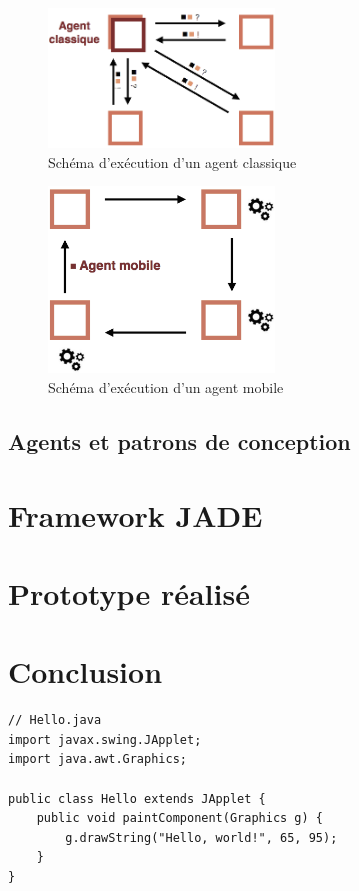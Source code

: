 \documentclass[conference]{IEEEtran}
\begin{document}
\begin{figure}[h]
\centering
\includegraphics[width=170pt]{images/classique.png}
\caption{Schéma d'exécution d'un agent classique}
\label{fig:classique}
\end{figure}

\begin{figure}[h]
\centering
\includegraphics[width=170pt]{images/mobile.png}
\caption{Schéma d'exécution d'un agent mobile}
\label{fig:mobile}
\end{figure}

\subsection{Agents et patrons de conception}
\vspace*{1mm}



\section{Framework JADE}

\section{Prototype réalisé}

\section{Conclusion}

\begin{lstlisting}
// Hello.java
import javax.swing.JApplet;
import java.awt.Graphics;

public class Hello extends JApplet {
    public void paintComponent(Graphics g) {
        g.drawString("Hello, world!", 65, 95);
    }    
}
\end{lstlisting}
\end{document}

